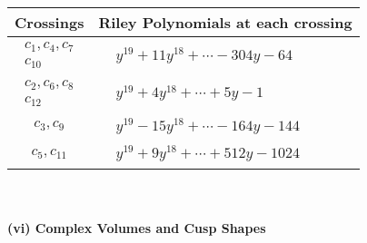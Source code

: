 \documentclass[1p]{elsarticle_modified}
\theoremstyle{definition}
\begin{document}
\begin{tabular}{m{50pt}|m{274pt}}
Crossings & \hspace{64pt}Riley Polynomials at each crossing \\
\hline $$\begin{aligned}c_{1},c_{4},c_{7}\\c_{10}\end{aligned}$$&$\begin{aligned}
&y^{19}+11 y^{18}+\cdots-304 y-64
\end{aligned}$\\
\hline $$\begin{aligned}c_{2},c_{6},c_{8}\\c_{12}\end{aligned}$$&$\begin{aligned}
&y^{19}+4 y^{18}+\cdots+5 y-1
\end{aligned}$\\
\hline $$\begin{aligned}c_{3},c_{9}\end{aligned}$$&$\begin{aligned}
&y^{19}-15 y^{18}+\cdots-164 y-144
\end{aligned}$\\
\hline $$\begin{aligned}c_{5},c_{11}\end{aligned}$$&$\begin{aligned}
&y^{19}+9 y^{18}+\cdots+512 y-1024
\end{aligned}$\\
\hline
\end{tabular}\\~\\
\newpage\flushleft \textbf{(vi) Complex Volumes and Cusp Shapes}
\end{document}
